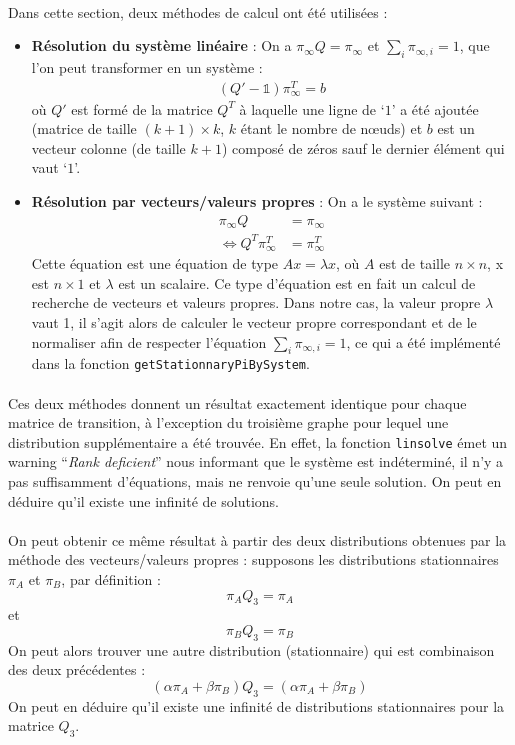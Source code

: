 \documentclass[a4paper,titlepage]{report}
\begin{document}
\paragraph{}
Dans cette section, deux méthodes de calcul ont été utilisées : 
\begin{itemize}
	\item \textbf{Résolution du système linéaire} : On a $\pi_{\infty} Q = \pi_{\infty}$ et $\sum_i \pi_{\infty, i} = 1$, que l'on peut transformer en un système : 
	\[
		\begin{aligned}
			(Q' - \mathbb{1}) \pi^T_{\infty} = b
		\end{aligned}
	\]
	où $Q'$ est formé de la matrice $Q^T$ à laquelle une ligne de `$1$' a été ajoutée (matrice de taille $(k+1) \times k$, $k$ étant le nombre de nœuds) et $b$ est un vecteur colonne (de taille $k+1$) composé de zéros sauf le dernier élément qui vaut `$1$'.
	\item \textbf{Résolution par vecteurs/valeurs propres} : On a le système suivant : 
	\[
		\begin{aligned}
			\pi_{\infty} Q &= \pi_{\infty}\\
			\Leftrightarrow Q^T \pi^T_{\infty} &= \pi^T_{\infty}
		\end{aligned}
	\]
	Cette équation est une équation de type $Ax = \lambda x$, où $A$ est de taille $n\times n$, x est $n\times 1$ et $\lambda$ est un scalaire. Ce type d'équation est en fait un calcul de recherche de vecteurs et valeurs propres. Dans notre cas, la valeur propre $\lambda$ vaut 1, il s'agit alors de calculer le vecteur propre correspondant et de le normaliser afin de respecter l'équation $\sum_i \pi_{\infty, i} = 1$, ce qui a été implémenté dans la fonction \texttt{getStationnaryPiBySystem}.
\end{itemize}
\paragraph{}
Ces deux méthodes donnent un résultat exactement identique pour chaque matrice de transition, à l'exception du troisième graphe pour lequel une distribution supplémentaire a été trouvée. En effet, la fonction \texttt{linsolve} émet un warning ``\textit{Rank deficient}'' nous informant que le système est indéterminé, il n'y a pas suffisamment d'équations, mais ne renvoie qu'une seule solution. On peut en déduire qu'il existe une infinité de solutions.
\paragraph{}
On peut obtenir ce même résultat à partir des deux distributions obtenues par la méthode des vecteurs/valeurs propres : supposons les distributions stationnaires $\pi_A$ et $\pi_B$, par définition : 
\[
	\pi_A Q_3 = \pi_A
\]
et
\[
	\pi_B Q_3 = \pi_B
\]
On peut alors trouver une autre distribution (stationnaire) qui est combinaison des deux précédentes :
\[
	(\alpha\pi_A + \beta\pi_B) Q_3 = (\alpha\pi_A + \beta\pi_B)
\]
On peut en déduire qu'il existe une infinité de distributions stationnaires pour la matrice $Q_3$.
\end{document}
